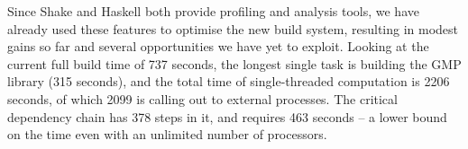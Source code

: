 Since Shake and Haskell both provide profiling and analysis tools, we have
already used these features to optimise the new build system, resulting in
modest gains so far and several opportunities we have yet to exploit. Looking at
the current full build time of 737 seconds, the longest single task is
building the GMP library (315 seconds), and the total time of single-threaded
computation is 2206 seconds, of which 2099 is calling out to external processes.
The critical dependency chain has 378 steps in it, and requires 463 seconds -- a
lower bound on the time even with an unlimited number of processors.
